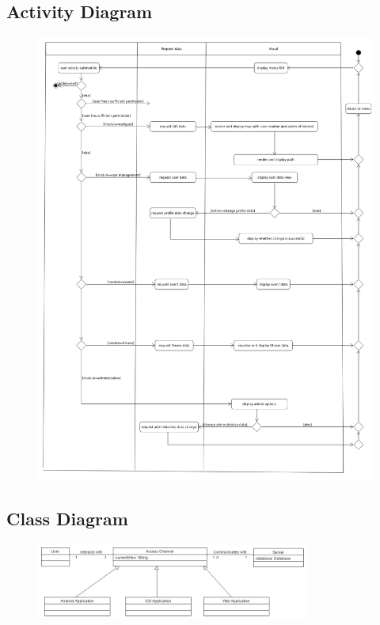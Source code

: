 \subsection{Activity Diagram}
\begin{figure}[!htbp]
	\includegraphics[width=\textwidth]{Access_Modules/AccessActivity.png}
\end{figure}

\subsection{Class Diagram}
\begin{figure}[!htbp]
	\includegraphics[width=0.8\textwidth]{Access_Modules/AccessClassDiagramV2.png}
\end{figure}
